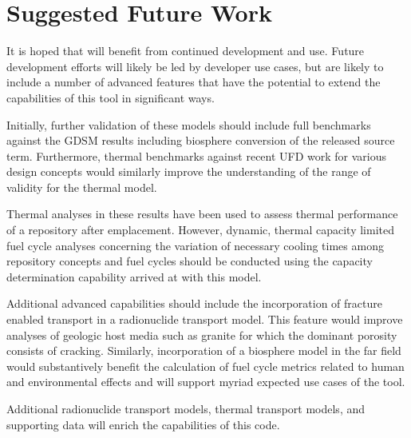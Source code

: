 \section{Suggested Future Work}
It is hoped that \Cyder will benefit from continued development and use. Future 
development efforts will likely be led by developer use cases, but are likely 
to include a number of advanced features that have the potential to extend the 
capabilities of this tool in significant ways. 

Initially, further validation of these models should include full benchmarks 
against the \gls{GDSM} results including biosphere conversion of the released 
source term.  Furthermore, thermal benchmarks against recent \gls{UFD} work for 
various design concepts would similarly improve the understanding of the range 
of validity for the thermal model. 

Thermal analyses in these results have been used to assess thermal performance 
of a repository after emplacement. However, dynamic, thermal capacity limited 
fuel cycle analyses concerning the variation of necessary cooling times among 
repository concepts and fuel cycles should be conducted using the capacity 
determination capability arrived at with this model.  

Additional advanced capabilities should include the incorporation of fracture 
enabled transport in a radionuclide transport model. This feature would improve 
analyses of geologic host media such as granite for which the dominant porosity 
consists of cracking. Similarly, incorporation of a biosphere model in the far field would 
substantively benefit the calculation of fuel cycle metrics related to human and 
environmental effects and will support myriad expected use cases of the tool.

Additional radionuclide transport models, thermal transport models, and 
supporting data will enrich the capabilities of this code. 

